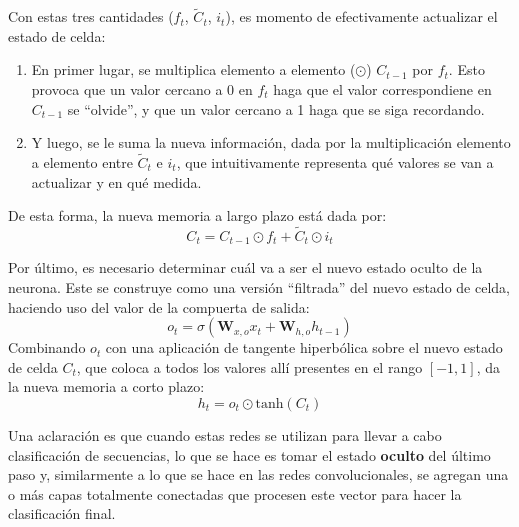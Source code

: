 \documentclass[../../main.tex]{subfiles}
\begin{document}
Con estas tres cantidades (\(f_t\), \(\tilde{C}_t\), \(i_t\)), es momento de
efectivamente actualizar el estado de celda:
\begin{enumerate}
    \item En primer lugar, se multiplica elemento a elemento (\(\odot\)) \(C_{t-1}\) por
    \(f_t\). Esto provoca que un valor cercano a 0 en \(f_t\) haga que el valor
    correspondiene en \(C_{t-1}\) se ``olvide'', y que un valor cercano a 1 haga que se
    siga recordando.
    \item Y luego, se le suma la nueva información, dada por la multiplicación
    elemento a elemento entre \(\tilde{C}_t\) e \(i_t\), que intuitivamente representa qué
    valores se van a actualizar y en qué medida.
\end{enumerate}
De esta forma, la nueva memoria a largo plazo está dada por:
\[
    C_t = C_{t-1} \odot f_t + \tilde{C}_t \odot i_t
\]

Por último, es necesario determinar cuál va a ser el nuevo estado oculto de la neurona.
Este se construye como una versión ``filtrada'' del nuevo estado de celda, haciendo
uso del valor de la compuerta de salida:
\[
    o_t = \sigma \left( \bm{W}_{x,o} x_t + \bm{W}_{h,o} h_{t-1} \right)
\]
Combinando \(o_t\) con una aplicación de tangente hiperbólica sobre el nuevo estado de
celda \(C_t\), que coloca a todos los valores allí presentes en el rango \([-1,1]\), da la
nueva memoria a corto plazo:
\[
    h_t = o_t \odot \text{tanh}(C_t)
\]

\bigskip
Una aclaración es que cuando estas redes se utilizan para llevar a cabo clasificación
de secuencias, lo que se hace es tomar el estado \textbf{oculto} del último paso y,
similarmente a lo que se hace en las redes convolucionales, se agregan una o más capas
totalmente conectadas que procesen este vector para hacer la clasificación final.
\end{document}
